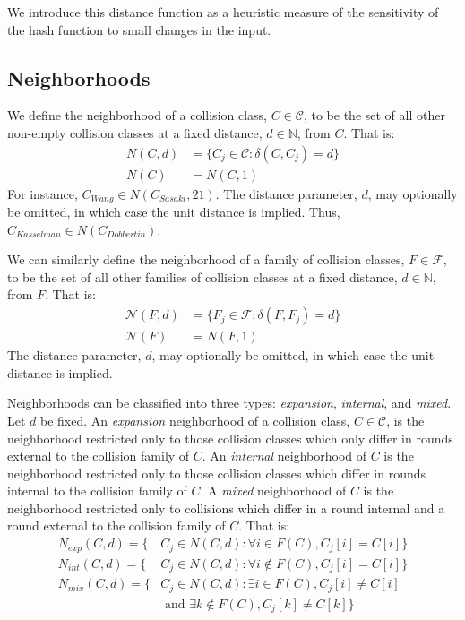 \documentclass[conference]{IEEEtran}
\begin{document}
We introduce this distance function as a heuristic measure of the
sensitivity of the hash function to small changes in the input.

\subsection{Neighborhoods}

We define the neighborhood of a collision class, $C \in \mathcal{C}$, to be the
set of all other non-empty collision classes at a fixed distance,
$d \in \mathbb{N}$, from $C$. That is:
\begin{align}
    N(C, d) & = \{ C_j \in \mathcal{C} : \delta(C, C_j) = d \} \\
    N(C) & = N(C, 1)
\end{align}
For instance, $C_{Wang} \in N(C_{Sasaki}, 21)$. The distance parameter, $d$,
may optionally be omitted, in which case the unit distance is implied. Thus,
$C_{Kasselman} \in N(C_{Dobbertin})$.

We can similarly define the neighborhood of a family of collision classes,
$F \in \mathcal{F}$, to be the set of all other families of collision classes
at a fixed distance, $d \in \mathbb{N}$, from $F$. That is:
\begin{align}
    \mathcal{N}(F, d) & = \{ F_j \in \mathcal{F} : \delta(F, F_j) = d \} \\
    \mathcal{N}(F) & = N(F, 1)
\end{align}
The distance parameter, $d$, may optionally be omitted, in which case the unit
distance is implied.

Neighborhoods can be classified into three types: \textit{expansion},
\textit{internal}, and \textit{mixed}. Let $d$ be fixed. An \textit{expansion}
neighborhood of a collision class, $C \in \mathcal{C}$, is the neighborhood
restricted only to those collision classes which only differ in rounds external
to the collision family of $C$. An \textit{internal} neighborhood of $C$ is the
neighborhood restricted only to those collision classes which differ in rounds
internal to the collision family of $C$. A \textit{mixed} neighborhood of $C$
is the neighborhood restricted only to collisions which differ in a round
internal and a round external to the collision family of $C$. That is:
\begin{align*}
    N_{exp}(C, d) = \{ & C_{j} \in N(C, d) : \forall i \in F(C), C_j[i] = C[i] \} \\
    N_{int}(C, d) = \{ & C_{j} \in N(C, d) : \forall i \not\in F(C), C_j[i] = C[i] \} \\
    N_{mix}(C, d) = \{ & C_{j} \in N(C, d) : \exists i \in F(C), C_j[i] \neq C[i] \\
        & \text{ and } \exists k \not\in F(C), C_j[k] \neq C[k] \}
\end{align*}
\end{document}
